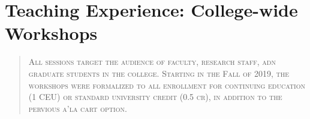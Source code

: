 \documentclass[11pt,a4paper,]{moderncv}
\begin{document}
\vspace{7 mm}

\hypertarget{teaching-experience-college-wide-workshops}{%
\section{Teaching Experience: College-wide
Workshops}\label{teaching-experience-college-wide-workshops}}

\begin{quote}
\textsc{All sessions target the audience of faculty, research staff, adn graduate students in the college.  Starting in the Fall of 2019, the workshops were formalized to all enrollment for continuing education (1 CEU) or standard university credit (0.5 cr), in addition to the pervious a'la cart option.}
\end{quote}
\end{document}
